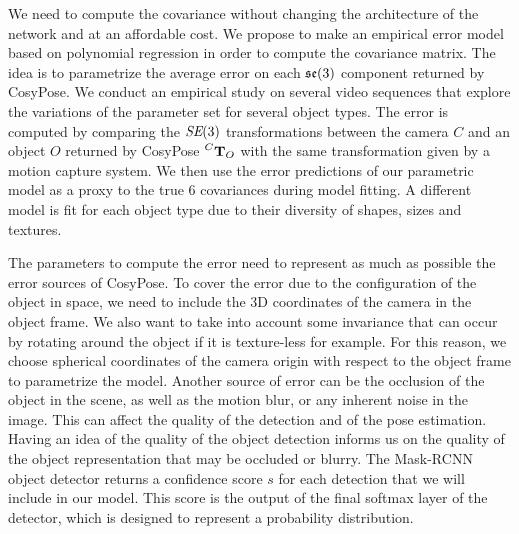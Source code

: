 We need to compute the covariance without changing the architecture of the network and at an affordable cost. 
We propose to make an empirical error model based on polynomial regression in order to compute the covariance matrix. 
The idea is to parametrize the average error on each ${\mathfrak {se}}(3)$ component returned by CosyPose. We conduct an empirical study on several video 
sequences that explore the variations of the parameter set for several object types. The error is computed by comparing the $\textit{SE}(3)$ transformations 
between the camera $C$ and an object $O$ returned by CosyPose $\prescript{C}{}{{\bf T}}_{O}$ with the same transformation given by a motion capture system. 
We then use the error predictions of our parametric model as a proxy to the true 6 covariances during model fitting. 
A different model is fit for each object type due to their diversity of shapes, sizes and textures.

The parameters to compute the error need to represent as much as possible the error sources of CosyPose. 
To cover the error due to the configuration of the object in space, we need to include the 3D coordinates of the camera in the object frame. 
We also want to take into account some invariance that can occur by rotating around the object if it is texture-less for example. 
For this reason, we choose spherical coordinates of the camera origin with respect to the object frame to parametrize the model. 
Another source of error can be the occlusion of the object in the scene, as well as the motion blur, or any inherent noise in the image. 
This can affect the quality of the detection and of the pose estimation. Having an idea of the quality of the object detection informs us on the 
quality of the object representation that may be occluded or blurry. The Mask-RCNN object detector returns a confidence score $s$ for each detection 
that we will include in our model. This score is the output of the final softmax layer of the detector, which is designed to represent a probability distribution.


